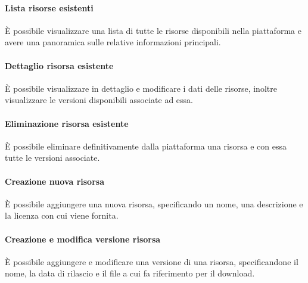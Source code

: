 \paragraph{Lista risorse esistenti}
È possibile visualizzare una lista di tutte le risorse disponibili nella
piattaforma e avere una panoramica sulle relative informazioni principali.

\paragraph{Dettaglio risorsa esistente}
È possibile visualizzare in dettaglio e modificare i dati delle risorse, inoltre
visualizzare le versioni disponibili associate ad essa.

\paragraph{Eliminazione risorsa esistente}
È possibile eliminare definitivamente dalla piattaforma una risorsa e con essa
tutte le versioni associate.

\paragraph{Creazione nuova risorsa}
È possibile aggiungere una nuova risorsa, specificando un nome, una descrizione
e la licenza con cui viene fornita.

\paragraph{Creazione e modifica versione risorsa}
È possibile aggiungere e modificare una versione di una risorsa, specificandone
il nome, la data di rilascio e il file a cui fa riferimento per il download.